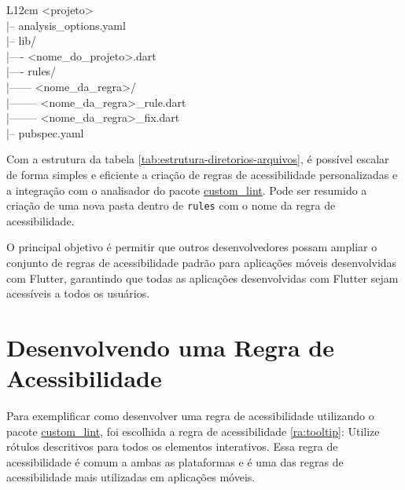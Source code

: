 \begin{table}[!htbp]
	\centering
	\renewcommand{\arraystretch}{1.1}
	\caption{Estrutura de diretórios e arquivos do projeto}
	\label{tab:estrutura-diretorios-arquivos}
	\ttfamily
	\begin{tabular}{ L{12cm} }
		\hline
		<projeto> \\
		|-- analysis\_options.yaml \\
		|-- lib/ \\
		|---- <nome\_do\_projeto>.dart \\
		|---- rules/ \\
		|------ <nome\_da\_regra>/ \\
		|-------- <nome\_da\_regra>\_rule.dart \\
		|-------- <nome\_da\_regra>\_fix.dart \\
		|-- pubspec.yaml \\
		\hline
	\end{tabular}
	\fontfamily{\rmdefault}\selectfont
	\vspace{2mm}
\end{table}

Com a estrutura da tabela \ref{tab:estrutura-diretorios-arquivos}, é possível escalar de forma simples e eficiente a criação de regras de acessibilidade personalizadas e a integração com o analisador do pacote \href{https://pub.dev/packages/custom_lint}{custom\_lint}. Pode ser resumido a criação de uma nova pasta dentro de \texttt{rules} com o nome da regra de acessibilidade.

O principal objetivo é permitir que outros desenvolvedores possam ampliar o conjunto de regras de acessibilidade padrão para aplicações móveis desenvolvidas com Flutter, garantindo que todas as aplicações desenvolvidas com Flutter sejam acessíveis a todos os usuários.

\section{Desenvolvendo uma Regra de Acessibilidade}

Para exemplificar como desenvolver uma regra de acessibilidade utilizando o pacote \href{https://pub.dev/packages/custom_lint}{custom\_lint}, foi escolhida a regra de acessibilidade \ref{ra:tooltip}: Utilize rótulos descritivos para todos os elementos interativos. Essa regra de acessibilidade é comum a ambas as plataformas e é uma das regras de acessibilidade mais utilizadas em aplicações móveis.

